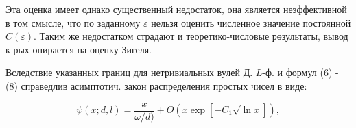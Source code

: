 \documentclass[10pt]{article}
\begin{document}
Эта оценка имеет однако существенный недостаток, она является неэффективной в том смысле, что по заданному $\varepsilon$ нельзя оценить численное значение постоянной $C(\varepsilon)$. Таким же недостатком страдают и теоретико-числовые рөзультаты, вывод к-рых опирается на оценку Зигеля.



Вследствие указанных границ для нетривиальных вулей Д. $L$-ф. и формул (6) - (8) справедлив асимптотич. закон распределения простых чисел в виде:



\[

\psi(x ; d, l)=\frac{x}{\omega / d)}+O\left(x \exp \left[-C_{1} \sqrt{\ln x}\right]\right),

\]
\end{document}

